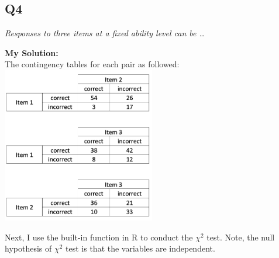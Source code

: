 \documentclass[
]{article}
\begin{document}
\hypertarget{q4}{%
\subsection{Q4}\label{q4}}

\emph{Responses to three items at a fixed ability level can be \ldots{}}

\textbf{My Solution: }\\
The contingency tables for each pair as followed:\\
\includegraphics[width=0.5\textwidth,height=\textheight]{"q4.png"}

Next, I use the built-in function in R to conduct the \(\chi^2\) test.
Note, the null hypothesis of \(\chi^2\) test is that the variables are
independent.
\end{document}
